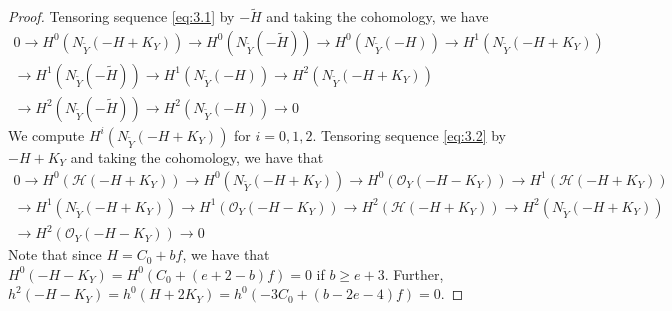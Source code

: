 \documentclass[11pt,reqno]{amsart}
\theoremstyle{plain}
\theoremstyle{definition}
\newcommand{\OO}{\mathcal{O}}
\newcommand{\Yt}{\widetilde{Y}}
\newcommand{\Ht}{\widetilde{H}}
\newcommand{\NYt}{N_{\Yt}}
\newcommand{\Hc}{\mathcal{H}}
\begin{document}
\begin{proof}
Tensoring sequence \eqref{eq:3.1} by $-\Ht$ and taking the cohomology, we have
\begin{multline}\label{eq:3.40}
0\to H^0(\NYt(-H+K_Y))\to H^0(\NYt(-\Ht))\to H^0(\NYt(-H))\to H^1(\NYt(-H+K_Y))\\
\to H^1(\NYt(-\Ht))\to H^1(\NYt(-H))\to H^2(\NYt(-H+K_Y))\\
\to H^2(\NYt(-\Ht))\to H^2(\NYt(-H))\to 0
\end{multline}
We compute $H^i(\NYt(-H+K_Y))$ for $i=0,1,2$. Tensoring sequence \eqref{eq:3.2} by $-H+K_Y$ and taking the cohomology, we have that
\begin{multline}\label{eq:3.41}
0\to H^0(\Hc(-H+K_Y))\to H^0(\NYt(-H+K_Y))\to H^0(\OO_Y(-H-K_Y))\to H^1(\Hc(-H+K_Y))\\
\to H^1(\NYt(-H+K_Y))\to H^1(\OO_Y(-H-K_Y))\to H^2(\Hc(-H+K_Y))\to H^2(\NYt(-H+K_Y))\\
\to H^2(\OO_Y(-H-K_Y))\to 0
\end{multline}
Note that since $H=C_0+bf$, we have that $H^0(-H-K_Y)=H^0(C_0+(e+2-b)f)=0$ if $b\ge e+3$. Further, $h^2(-H-K_Y)=h^0(H+2K_Y)=h^0(-3C_0+(b-2e-4)f)=0$.


\end{proof}
\end{document}
